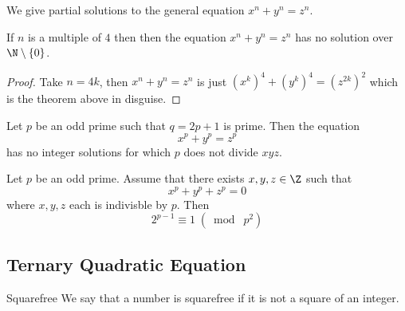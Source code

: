 \documentclass[a4paper]{article}
\begin{document}
We give partial solutions to the general equation $x^n+y^n=z^n$. 

\begin{crl}{}{} If $n$ is a multiple of $4$ then then the equation $x^n+y^n=z^n$ has no solution over $\N\setminus\{0\}$. \tcbline
\begin{proof}
Take $n=4k$, then $x^n+y^n=z^n$ is just $(x^k)^4+(y^k)^4=(z^{2k})^2$ which is the theorem above in disguise. 
\end{proof}
\end{crl}

\begin{thm}{}{} Let $p$ be an odd prime such that $q=2p+1$ is prime. Then the equation $$x^p+y^p=z^p$$ has no integer solutions for which $p$ does not divide $xyz$. 
\end{thm}

\begin{thm}{}{} Let $p$ be an odd prime. Assume that there exists $x,y,z\in\Z$ such that $$x^p+y^p+z^p=0$$ where $x,y,z$ each is indivisble by $p$. Then $$2^{p-1}\equiv 1\;(\bmod\; p^2)$$
\end{thm}

\subsection{Ternary Quadratic Equation}
\begin{defn}{Squarefree}{} We say that a number is squarefree if it is not a square of an integer. 
\end{defn}
\end{document}
